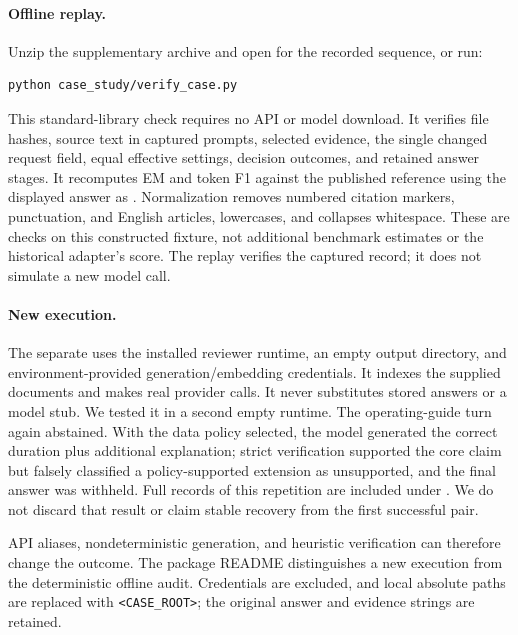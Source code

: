 \paragraph{Offline replay.}
Unzip the supplementary archive and open  for the recorded sequence, or run:
\begin{verbatim}
python case_study/verify_case.py
\end{verbatim}
This standard-library check requires no API or model download. It verifies file hashes, source text in captured prompts, selected evidence, the single changed request field, equal effective settings, decision outcomes, and retained answer stages. It recomputes EM and token F1 against the published reference using the displayed answer as . Normalization removes numbered citation markers, punctuation, and English articles, lowercases, and collapses whitespace. These are checks on this constructed fixture, not additional benchmark estimates or the historical adapter's score. The replay verifies the captured record; it does not simulate a new model call.

\paragraph{New execution.}
The separate  uses the installed reviewer runtime, an empty output directory, and environment-provided generation/embedding credentials. It indexes the supplied documents and makes real provider calls. It never substitutes stored answers or a model stub. We tested it in a second empty runtime. The operating-guide turn again abstained. With the data policy selected, the model generated the correct duration plus additional explanation; strict verification supported the core claim but falsely classified a policy-supported extension as unsupported, and the final answer was withheld. Full records of this repetition are included under . We do not discard that result or claim stable recovery from the first successful pair.

API aliases, nondeterministic generation, and heuristic verification can therefore change the outcome. The package README distinguishes a new execution from the deterministic offline audit. Credentials are excluded, and local absolute paths are replaced with \texttt{<CASE\_ROOT>}; the original answer and evidence strings are retained.


